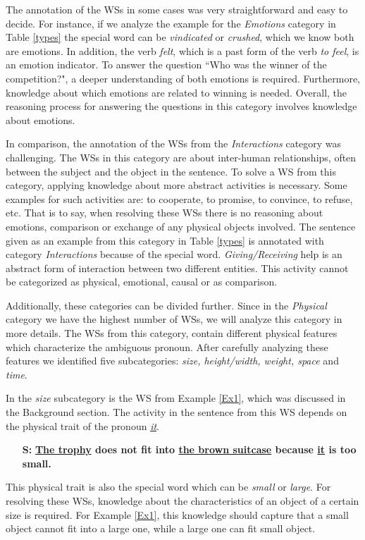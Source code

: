 The annotation of the WSs in some cases was very straightforward and easy to decide. For instance, if we analyze the example for the \textit{Emotions} category in Table \ref{types} the special word can be \textit{vindicated} or \textit{crushed}, which we know both are emotions. In addition, the verb \textit{felt}, which is a past form of the verb \textit{to feel}, is an emotion indicator. To answer the question ``Who was the winner of the competition?", a deeper understanding of both emotions is required. Furthermore, knowledge about which emotions are related to winning is needed. 
Overall, the reasoning process for answering the questions in this category involves knowledge about emotions. 

In comparison, the annotation of the WSs from the \textit{Interactions} category was challenging. The WSs in this category are about inter-human relationships, often between the subject and the object in the sentence. 
To solve a WS from this category, applying knowledge about more abstract activities is necessary. Some examples for such activities are: to cooperate, to promise, to convince, to refuse, etc. That is to say, when resolving these WSs there is no reasoning about emotions, comparison or exchange of any physical objects involved.  
The sentence given as an example from this category in Table \ref{types} is annotated with category \textit{Interactions} because of the special word. \textit{Giving/Receiving} help is an abstract form of interaction between two different entities. This activity cannot be categorized as physical, emotional, causal or as comparison.

Additionally, these categories can be divided further.
Since in the \textit{Physical} category we have the highest number of WSs, we will analyze this category in more details. The WSs from this category, contain different physical features which characterize the ambiguous pronoun. After carefully analyzing these features we identified five subcategories: \textit{size, height/width, weight, space} and \textit{time}. 

In the \textit{size} subcategory is the WS from Example \ref{Ex1}, which was discussed in the Background section. 
The activity in the sentence from this WS depends on the physical trait of the pronoun \textit{\underline{it}}.
\begin{itemize}
	\item[\textbf{S:}] \textbf{\underline{The trophy} does not fit into \underline{the brown suitcase} because \underline{it} is too small.}
\end{itemize}
This physical trait is also the special word which can be \textit{small} or \textit{large}. For resolving these WSs, knowledge about the characteristics of an object of a certain size is required. For Example \ref{Ex1}, this knowledge should capture that a small object cannot fit into a large one, while a large one can fit small object.


